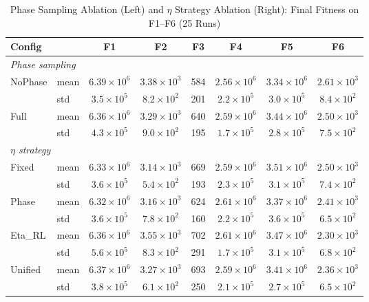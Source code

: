 \documentclass[conference]{IEEEtran}
\begin{document}
\begin{table}[htbp]
\centering
\scriptsize
\caption{Phase Sampling Ablation (Left) and $\eta$ Strategy Ablation (Right): Final Fitness on F1--F6 (25 Runs)}
\label{tab:phase_eta}
\begin{tabular}{llcccccc}
\toprule
\textbf{Config} & & F1 & F2 & F3 & F4 & F5 & F6 \\
\midrule
\multicolumn{8}{l}{\textit{Phase sampling}} \\
NoPhase & mean & $6.39 \times 10^6$ & $3.38 \times 10^3$ & 584 & $2.56 \times 10^6$ & $3.34 \times 10^6$ & $2.61 \times 10^3$ \\
 & std & $3.5 \times 10^5$ & $8.2 \times 10^2$ & 201 & $2.2 \times 10^5$ & $3.0 \times 10^5$ & $8.4 \times 10^2$ \\
Full & mean & $6.36 \times 10^6$ & $3.29 \times 10^3$ & 640 & $2.59 \times 10^6$ & $3.44 \times 10^6$ & $2.50 \times 10^3$ \\
 & std & $4.3 \times 10^5$ & $9.0 \times 10^2$ & 195 & $1.7 \times 10^5$ & $2.8 \times 10^5$ & $7.5 \times 10^2$ \\
\midrule
\multicolumn{8}{l}{\textit{$\eta$ strategy}} \\
Fixed & mean & $6.33 \times 10^6$ & $3.14 \times 10^3$ & 669 & $2.59 \times 10^6$ & $3.51 \times 10^6$ & $2.50 \times 10^3$ \\
 & std & $3.6 \times 10^5$ & $5.4 \times 10^2$ & 193 & $2.3 \times 10^5$ & $3.1 \times 10^5$ & $7.4 \times 10^2$ \\
Phase & mean & $6.32 \times 10^6$ & $3.16 \times 10^3$ & 624 & $2.61 \times 10^6$ & $3.37 \times 10^6$ & $2.41 \times 10^3$ \\
 & std & $3.6 \times 10^5$ & $7.8 \times 10^2$ & 160 & $2.2 \times 10^5$ & $3.6 \times 10^5$ & $6.5 \times 10^2$ \\
Eta\_RL & mean & $6.36 \times 10^6$ & $3.55 \times 10^3$ & 702 & $2.61 \times 10^6$ & $3.47 \times 10^6$ & $2.30 \times 10^3$ \\
 & std & $5.6 \times 10^5$ & $8.3 \times 10^2$ & 291 & $1.7 \times 10^5$ & $3.1 \times 10^5$ & $6.8 \times 10^2$ \\
Unified & mean & $6.37 \times 10^6$ & $3.27 \times 10^3$ & 693 & $2.59 \times 10^6$ & $3.41 \times 10^6$ & $2.36 \times 10^3$ \\
 & std & $3.8 \times 10^5$ & $6.1 \times 10^2$ & 250 & $2.1 \times 10^5$ & $2.7 \times 10^5$ & $6.5 \times 10^2$ \\
\bottomrule
\end{tabular}
\end{table}
\end{document}
